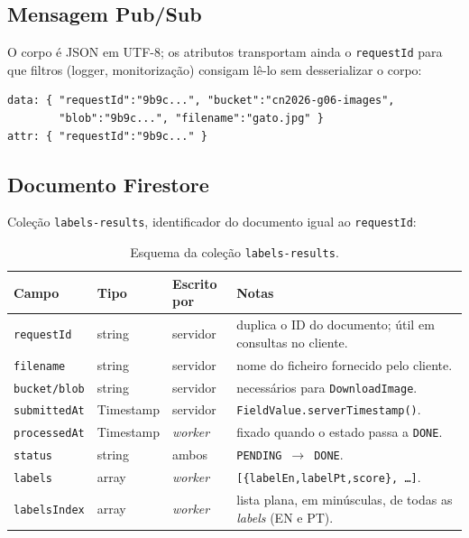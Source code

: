 \documentclass[11pt,a4paper]{article}
\begin{document}
\subsection{Mensagem Pub/Sub}
O corpo \'e JSON em UTF-8; os atributos transportam ainda o
\texttt{requestId} para que filtros (logger, monitoriza\c{c}\~ao) consigam
l\^e-lo sem desserializar o corpo:

\begin{lstlisting}[language={}]
data: { "requestId":"9b9c...", "bucket":"cn2026-g06-images",
        "blob":"9b9c...", "filename":"gato.jpg" }
attr: { "requestId":"9b9c..." }
\end{lstlisting}

\subsection{Documento Firestore}
Cole\c{c}\~ao \texttt{labels-results}, identificador do documento igual ao
\texttt{requestId}:

\begin{table}[h]
\centering
\small
\begin{tabular}{@{}p{28mm}p{18mm}p{20mm}p{78mm}@{}}
\toprule
Campo          & Tipo      & Escrito por & Notas \\
\midrule
\texttt{requestId}    & string    & servidor & duplica o ID do documento; \'util em consultas no cliente. \\
\texttt{filename}     & string    & servidor & nome do ficheiro fornecido pelo cliente. \\
\texttt{bucket/blob}  & string    & servidor & necess\'arios para \texttt{DownloadImage}. \\
\texttt{submittedAt}  & Timestamp & servidor & \texttt{FieldValue.serverTimestamp()}. \\
\texttt{processedAt}  & Timestamp & \emph{worker} & fixado quando o estado passa a \texttt{DONE}. \\
\texttt{status}       & string    & ambos    & \texttt{PENDING}~$\rightarrow$~\texttt{DONE}. \\
\texttt{labels}       & array     & \emph{worker} & \texttt{[\{labelEn,labelPt,score\}, \dots]}. \\
\texttt{labelsIndex}  & array     & \emph{worker} & lista plana, em min\'usculas, de todas as \emph{labels} (EN e PT). \\
\bottomrule
\end{tabular}
\caption{Esquema da cole\c{c}\~ao \texttt{labels-results}.}
\end{table}
\end{document}
